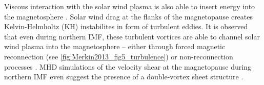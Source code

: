 Viscous interaction with the solar wind plasma is also able to insert energy into the magnetosphere \citep{Alfven1942}. Solar wind drag at the flanks of the magnetopause creates Kelvin-Helmholtz (KH) instabilites in form of turbulent eddies. It is observed that even during northern IMF, these turbulent vortices are able to channel solar wind plasma into the magnetosphere -- either through forced magnetic reconnection (see \autoref{fig:Merkin2013_fig5_turbulence}) or non-reconnection processes \citep{Otto2003,Phan2005}. MHD simulations of the velocity shear at the magnetopause during northern IMF even suggest the presence of a double-vortex sheet structure \citep{Merkin2013}.
\begin{figure}[htb]
\end{figure}


